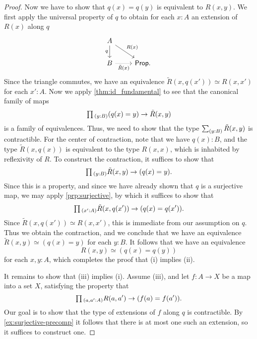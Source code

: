 \begin{proof}
  Now we have to show that $q(x)=q(y)$ is equivalent to $R(x,y)$. We first apply the universal property of $q$ to obtain for each $x:A$ an extension of $R(x)$ along $q$
  \begin{equation*}
    \begin{tikzcd}
      A \arrow[d,swap,"q"] \arrow[dr,"R(x)"] \\
      B \arrow[r,densely dotted,swap,"\tilde{R}(x)"] & \prop.
    \end{tikzcd}
  \end{equation*}
  Since the triangle commutes, we have an equivalence $\tilde{R}(x,q(x'))\simeq R(x,x')$ for each $x':A$. Now we apply \cref{thm:id_fundamental} to see that the canonical family of maps
  \begin{equation*}
    \prd{y:B}(q(x)=y)\to \tilde{R}(x,y)
  \end{equation*}
  is a family of equivalences. Thus, we need to show that the type $\sm{y:B}\tilde{R}(x,y)$ is contractible. For the center of contraction, note that we have $q(x):B$, and the type $\tilde{R}(x,q(x))$ is equivalent to the type $R(x,x)$, which is inhabited by reflexivity of $R$. To construct the contraction, it suffices to show that
  \begin{equation*}
    \prd{y:B}\tilde{R}(x,y)\to (q(x)=y).
  \end{equation*}
  Since this is a property, and since we have already shown that $q$ is a surjective map, we may apply \cref{prp:surjective}, by which it suffices to show that
  \begin{equation*}
    \prd{x':A}\tilde{R}(x,q(x'))\to (q(x)=q(x')).
  \end{equation*}
  Since $\tilde{R}(x,q(x'))\simeq R(x,x')$, this is immediate from our assumption on $q$. Thus we obtain the contraction, and we conclude that we have an equivalence $\tilde{R}(x,y)\simeq (q(x)=y)$ for each $y:B$. It follows that we have an equivalence
  \begin{equation*}
    R(x,y)\simeq (q(x)=q(y))
  \end{equation*}
  for each $x,y:A$, which completes the proof that (i) implies (ii).
  
  It remains to show that (iii) implies (i). Assume (iii), and let $f:A\to X$ be a map into a set $X$, satisfying the property that
  \begin{equation*}
    \prd{a,a':A}R(a,a')\to (f(a)=f(a')).
  \end{equation*}
  Our goal is to show that the type of extensions of $f$ along $q$ is contractible. By \cref{ex:surjective-precomp} it follows that there is at most one such an extension, so it suffices to construct one.


\end{proof}
